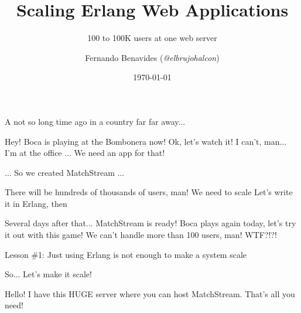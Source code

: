 \documentclass[utf8]{beamer}
\begin{document}
\title{Scaling Erlang Web Applications}
\subtitle{100 to 100K users at one web server}
\author{Fernando Benavides (\textit{@elbrujohalcon})}
\date{\today}


\frame{\titlepage}

\begin{frame}
A not so long time ago in a country far far away...
\end{frame}

\begin{frame}
Hey! Boca is playing at the Bombonera now!
Ok, let's watch it!
I can't, man... I'm at the office
...
We need an app for that!
\end{frame}

\begin{frame}
... So we created MatchStream ...
\end{frame}

\begin{frame}
There will be hundreds of thousands of users, man!
We need to \alert{scale}
\pause
Let's write it in Erlang, then
\end{frame}

\begin{frame}
Several days after that...
\pause
MatchStream is ready!
Boca plays again today, let's try it out with this game!
\pause
We can't handle more than 100 users, man! WTF?!?!
\end{frame}

\begin{frame}
Lesson \#1: Just using Erlang is not enough to make a system scale
\end{frame}

\begin{frame}
So... Let's make it scale!
\end{frame}

\begin{frame}
Hello! I have this HUGE server where you can host MatchStream. That's all you need!
\end{frame}
\end{document}
